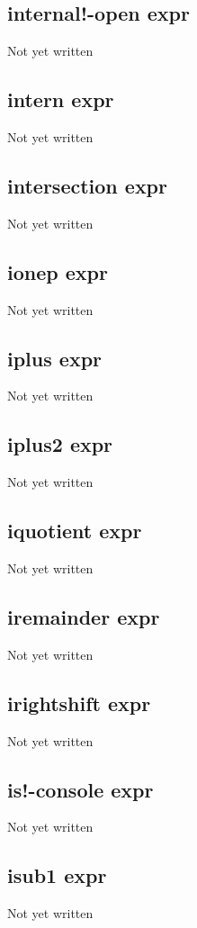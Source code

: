 \documentclass[a4paper,11pt]{article}
\begin{document}
{\subsection{\ttfamily internal!-open expr}
   Not yet written

\subsection{\ttfamily intern expr}
   Not yet written

\subsection{\ttfamily intersection expr}
   Not yet written

\subsection{\ttfamily ionep expr}
   Not yet written

\subsection{\ttfamily iplus expr}
   Not yet written

\subsection{\ttfamily iplus2 expr}
   Not yet written

\subsection{\ttfamily iquotient expr}
   Not yet written

\subsection{\ttfamily iremainder expr}
   Not yet written

\subsection{\ttfamily irightshift expr}
   Not yet written

\subsection{\ttfamily is!-console expr}
   Not yet written

\subsection{\ttfamily isub1 expr}
   Not yet written

}
\end{document}
